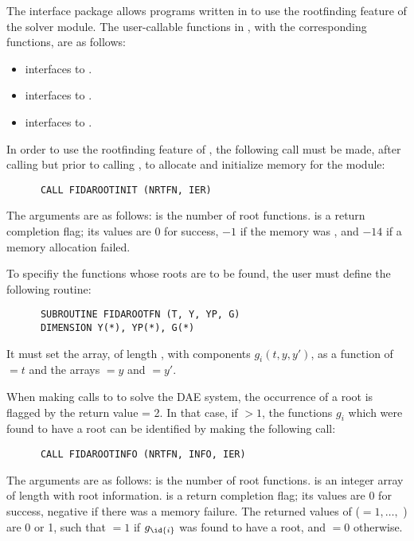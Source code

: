 The {\fidaroot} interface package allows programs written in {\F} to
use the rootfinding feature of the {\ida} solver module.
The user-callable functions in {\fidaroot}, with the corresponding
{\ida} functions, are as follows: 
\begin{itemize}
  \item {} interfaces to .
  \item {} interfaces to .
  \item {} interfaces to .
\end{itemize}
In order to use the rootfinding feature of {\ida}, the following call must
be made, after calling  but prior to calling ,
to allocate and initialize memory for the  module:
\begin{verbatim}
      CALL FIDAROOTINIT (NRTFN, IER)
\end{verbatim}
The arguments are as follows:
 is the number of root functions.
 is a return completion flag; its values are $0$ for success, $-1$ 
if the  memory was , and $-14$ if a memory allocation failed.

To specifiy the functions whose roots are to be found, the user must
define the following routine:
\begin{verbatim}
      SUBROUTINE FIDAROOTFN (T, Y, YP, G)
      DIMENSION Y(*), YP(*), G(*)
\end{verbatim}
It must set the  array, of length , with components
$g_i(t,y,y')$, as a function of  $= t$ and the arrays  $= y$
and  $= y'$.

When making calls to  to solve the DAE system, the occurrence
of a root is flagged by the return value  = 2.  In that case, if
 $> 1$, the functions $g_i$ which were found to have a root can
be identified by making the following call:
\begin{verbatim}
      CALL FIDAROOTINFO (NRTFN, INFO, IER)
\end{verbatim}
The arguments are as follows:  is the number of root functions.
 is an integer array of length  with root information.
 is a return completion flag; its values are $0$ for success, 
negative if there was a memory failure.  The returned values of 
($ = 1,\ldots,$ ) are 0 or 1, such that  $ = 1$
if $g_{\id{i}}$ was found to have a root, and  $ = 0$ otherwise.

